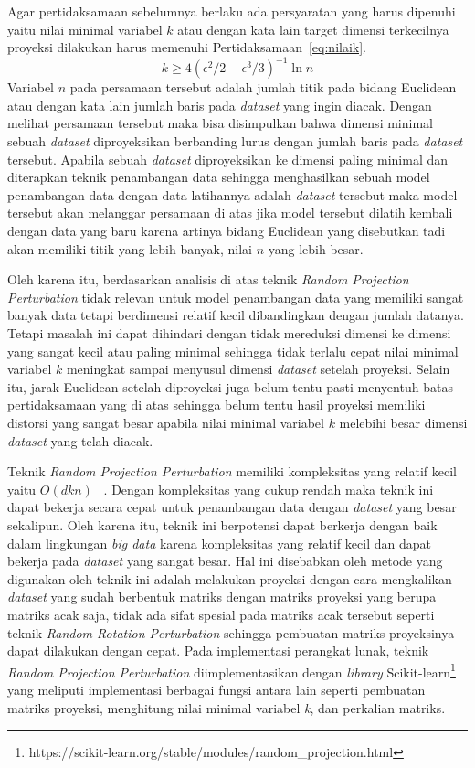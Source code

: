 Agar pertidaksamaan sebelumnya berlaku ada persyaratan yang harus dipenuhi yaitu nilai minimal variabel \(k\) atau dengan kata lain target dimensi terkecilnya proyeksi dilakukan harus memenuhi Pertidaksamaan~\ref{eq:nilaik}.
\begin{equation}\label{eq:nilaik}
	k \geq 4(\epsilon^{2}/2-\epsilon^{3}/3)^{-1}\ln{n}
\end{equation}
Variabel \(n\) pada persamaan tersebut adalah jumlah titik pada bidang Euclidean atau dengan kata lain jumlah baris pada \textit{dataset} yang ingin diacak. Dengan melihat persamaan tersebut maka bisa disimpulkan bahwa dimensi minimal sebuah \textit{dataset} diproyeksikan berbanding lurus dengan jumlah baris pada \textit{dataset} tersebut. Apabila sebuah \textit{dataset} diproyeksikan ke dimensi paling minimal dan diterapkan teknik penambangan data sehingga menghasilkan sebuah model penambangan data dengan data latihannya adalah \textit{dataset} tersebut maka model tersebut akan melanggar persamaan di atas jika model tersebut dilatih kembali dengan data yang baru karena artinya bidang Euclidean yang disebutkan tadi akan memiliki titik yang lebih banyak, nilai \(n\) yang lebih besar. 

Oleh karena itu, berdasarkan analisis di atas teknik \textit{Random Projection Perturbation} tidak relevan untuk model penambangan data yang memiliki sangat banyak data tetapi berdimensi relatif kecil dibandingkan dengan jumlah datanya. Tetapi masalah ini dapat dihindari dengan tidak mereduksi dimensi ke dimensi yang sangat kecil atau paling minimal sehingga tidak terlalu cepat nilai minimal variabel \(k\) meningkat sampai menyusul dimensi \textit{dataset} setelah proyeksi. Selain itu, jarak Euclidean setelah diproyeksi juga belum tentu pasti menyentuh batas pertidaksamaan yang di atas sehingga belum tentu hasil proyeksi memiliki distorsi yang sangat besar apabila nilai minimal variabel \(k\) melebihi besar dimensi \textit{dataset} yang telah diacak.

Teknik \textit{Random Projection Perturbation} memiliki kompleksitas yang relatif kecil yaitu \(O(dkn)\) ~\cite{bingham:01:projection}. Dengan kompleksitas yang cukup rendah maka teknik ini dapat bekerja secara cepat untuk penambangan data dengan \textit{dataset} yang besar sekalipun. Oleh karena itu, teknik ini berpotensi dapat berkerja dengan baik dalam lingkungan \textit{big data} karena kompleksitas yang relatif kecil dan dapat bekerja pada \textit{dataset} yang sangat besar. Hal ini disebabkan oleh metode yang digunakan oleh teknik ini adalah melakukan proyeksi dengan cara mengkalikan \textit{dataset} yang sudah berbentuk matriks dengan matriks proyeksi yang berupa matriks acak saja, tidak ada sifat spesial pada matriks acak tersebut seperti teknik \textit{Random Rotation Perturbation} sehingga pembuatan matriks proyeksinya dapat dilakukan dengan cepat. Pada implementasi perangkat lunak, teknik \textit{Random Projection Perturbation} diimplementasikan dengan \textit{library} Scikit-learn\footnote{https://scikit-learn.org/stable/modules/random\_projection.html} yang meliputi implementasi berbagai fungsi antara lain seperti pembuatan matriks proyeksi, menghitung nilai minimal variabel \textit{k}, dan perkalian matriks.

